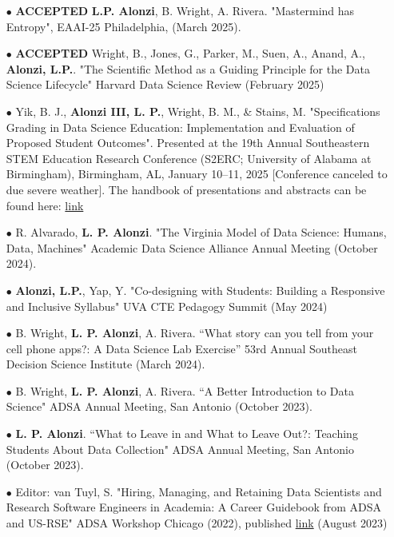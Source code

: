 \documentclass{article}[10pt]
\begin{document}
\begin{itemize}


\item [$\bullet$] {\bf ACCEPTED} {\bf L.P. Alonzi}, B. Wright, A. Rivera. "Mastermind has Entropy", EAAI-25 Philadelphia, (March 2025).

\item [$\bullet$] {\bf ACCEPTED} Wright, B., Jones, G., Parker, M., Suen, A., Anand, A., {\bf Alonzi, L.P.}. "The Scientific Method as a Guiding Principle for the Data Science Lifecycle" Harvard Data Science Review (February 2025)

\item[$\bullet$] Yik, B. J., {\bf Alonzi III, L. P.}, Wright, B. M., \& Stains, M. "Specifications Grading in Data Science Education: Implementation and Evaluation of Proposed Student Outcomes". Presented at the 19th Annual Southeastern STEM Education Research Conference (S2ERC; University of Alabama at Birmingham), Birmingham, AL, January 10–11, 2025 [Conference canceled to due severe weather]. The handbook of presentations and abstracts can be found here: \href{https://tsec.mtsu.edu/wp-content/uploads/sites/67/2025/01/SSERC-2025-Program-Abstracts-1.pdf}{link}

\item [$\bullet$] R. Alvarado, {\bf L. P. Alonzi}. "The Virginia Model of Data Science: Humans, Data, Machines" Academic Data Science Alliance Annual Meeting (October 2024). 

\item [$\bullet$] {\bf Alonzi, L.P.}, Yap, Y. "Co-designing with Students: Building a Responsive and Inclusive Syllabus" UVA CTE Pedagogy Summit (May 2024)

\item [$\bullet$] B. Wright, {\bf L. P. Alonzi}, A. Rivera. “What story can you tell from your cell phone apps?: A Data Science Lab Exercise” 53rd Annual Southeast Decision Science Institute (March 2024).

\item [$\bullet$] B. Wright, {\bf L. P. Alonzi}, A. Rivera. “A Better Introduction to Data Science" ADSA Annual Meeting, San Antonio (October 2023).

\item [$\bullet$] {\bf L. P. Alonzi}. “What to Leave in and What to Leave Out?: Teaching Students About Data Collection" ADSA Annual Meeting, San Antonio (October 2023).

\item [$\bullet$] Editor: van Tuyl, S. "Hiring, Managing, and Retaining Data Scientists and Research Software Engineers in Academia: A Career Guidebook from ADSA and US-RSE" ADSA Workshop Chicago (2022), published \href{https://zenodo.org/records/8329337}{link} (August 2023)


\end{itemize}
\end{document}

